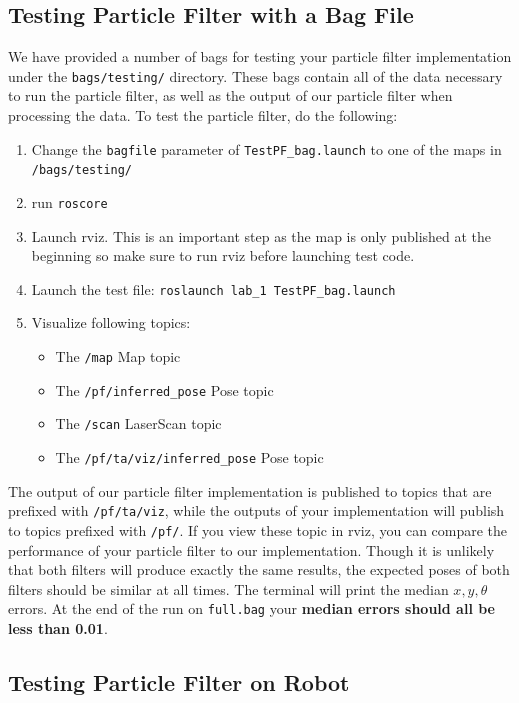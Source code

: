 \documentclass[final]{article}
\newcommand{\code}[1]{\texttt{#1}}
\newcommand{\cmdline}[1]{\colorbox{gray!30}{\texttt{#1}}}
\begin{document}
\subsection{Testing Particle Filter with a Bag File}
\label{sec:test-pf-bag}
We have provided a number of bags for testing your particle filter implementation under the \code{bags/testing/} directory. These bags contain all of the data necessary to run the particle filter, as well as the output of our particle filter when processing the data. 
To test the particle filter, do the following:
\begin{enumerate}
\item Change the \code{bagfile} parameter of \code{TestPF\_bag.launch} to one of the maps in \code{/bags/testing/}
\item run \code{roscore}
\item Launch rviz. This is an important step as the map is only published at the beginning so make sure to run rviz before launching test code.
\item Launch the test file: \cmdline{roslaunch lab\_1 TestPF\_bag.launch}
\item Visualize following topics:
	\begin{itemize}
	    \item The \code{/map} Map topic
		\item The \code{/pf/inferred\_pose} Pose topic
		\item The \code{/scan} LaserScan topic
		\item The \code{/pf/ta/viz/inferred\_pose} Pose topic
	\end{itemize}
\end{enumerate} 

The output of our particle filter implementation is published to topics that are prefixed with \code{/pf/ta/viz}, while the outputs of your implementation will publish to topics prefixed with \code{/pf/}. If you view these topic in rviz, you can compare the performance of your particle filter to our implementation. Though it is unlikely that both filters will produce exactly the same results, the expected poses of both filters should be similar at all times. The terminal will print the median \(x,y,\theta\) errors. At the end of the run on \code{full.bag} your \textbf{median errors should all be less than 0.01}.

\subsection{Testing Particle Filter on Robot}
\end{document}

